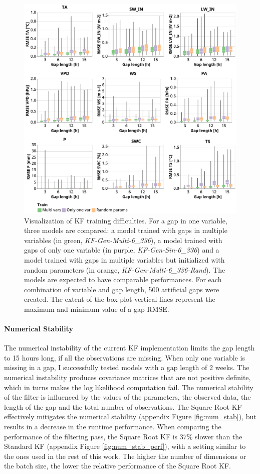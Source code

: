 \documentclass{article}
\newcommand{\imgwidth}{6in}
\begin{document}
\begin{figure}
\centerline{\includegraphics[width=\imgwidth]{train_compare}}
\caption{Visualization of KF training difficulties. For a gap in one variable, three models are compared: a model trained with gaps in multiple variables (in green, \textit{KF-Gen-Multi-6\_336}), a model trained with gaps of only one variable (in purple, \textit{KF-Gen-Sin-6\_336}) and a model trained with gaps in multiple variables but initialized with random parameters (in orange, \textit{KF-Gen-Multi-6\_336-Rand}). The models are expected to have comparable performances. For each combination of variable and gap length, 500 artificial gaps were created. The extent of the box plot vertical lines represent the maximum and minimum value of a gap RMSE.}
\label{fig:train_compare}
\end{figure}

\paragraph{Numerical Stability} The numerical instability of the current KF implementation limits the gap length to 15 hours long, if all the observations are missing. When only one variable is missing in a gap, I successfully tested models with a gap length of 2 weeks.
The numerical instability produces covariance matrices that are not positive definite, which in turns makes the log likelihood computation fail. The numerical stability of the filter is influenced by the values of the parameters, the observed data, the length of the gap and the total number of observations.
The Square Root KF effectively mitigates the numerical stability (appendix Figure \ref{fig:num_stab}), but results in a decrease in the runtime performance. When comparing the performance of the filtering pass, the Square Root KF is 37\% slower than the Standard KF (appendix Figure \ref{fig:num_stab_perf}), with a setting similar to the ones used in the rest of this work. The higher the number of dimensions or the batch size, the lower the relative performance of the Square Root KF.
\end{document}
